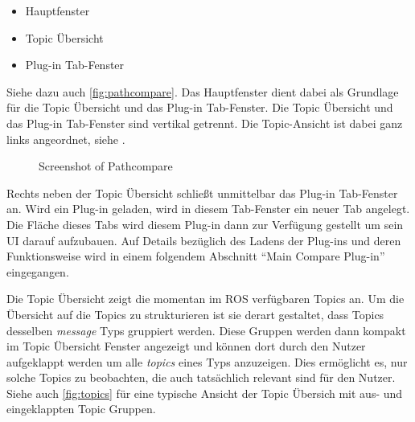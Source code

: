 \begin{itemize}
\item Hauptfenster
\item Topic Übersicht
\item Plug-in Tab-Fenster
\end{itemize}

Siehe dazu auch \autoref{fig:pathcompare}.
Das Hauptfenster dient dabei als Grundlage für die Topic Übersicht und das
Plug-in Tab-Fenster. Die Topic Übersicht und das Plug-in Tab-Fenster sind vertikal
getrennt. Die Topic-Ansicht ist dabei ganz links angeordnet, siehe   .

\begin{figure}[t]
  \begin{center}
  \end{center}
  \caption{Screenshot of Pathcompare}
  \label{fig:pathcompare}
\end{figure}

Rechts neben der Topic Übersicht schließt unmittelbar das Plug-in Tab-Fenster
an. Wird ein Plug-in geladen, wird in diesem Tab-Fenster ein neuer Tab
angelegt. Die Fläche dieses Tabs wird diesem Plug-in dann zur Verfügung
gestellt um sein UI darauf aufzubauen. Auf Details bezüglich des Ladens der
Plug-ins und deren Funktionsweise wird in einem folgendem Abschnitt ``Main
Compare Plug-in'' eingegangen. 

Die Topic Übersicht zeigt die momentan im ROS verfügbaren Topics an. 
Um die Übersicht auf die Topics zu strukturieren ist sie derart
gestaltet, dass Topics desselben \textit{message} Typs gruppiert werden. Diese
Gruppen werden dann kompakt im Topic Übersicht Fenster angezeigt und können dort durch
den Nutzer aufgeklappt werden um alle \textit{topics} eines Typs anzuzeigen.
Dies ermöglicht es, nur solche Topics zu beobachten, die auch
tatsächlich relevant sind für den Nutzer. 
Siehe auch \autoref{fig:topics} für eine typische Ansicht der Topic Übersich mit aus- und
eingeklappten Topic Gruppen.

